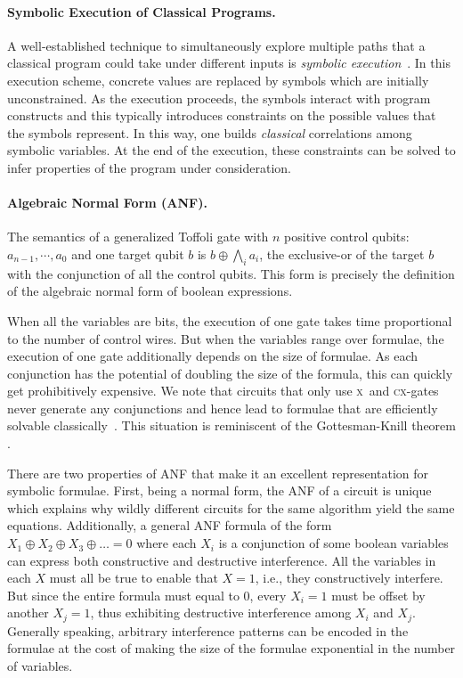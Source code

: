 \documentclass[aps,prl,twocolumn,superscriptaddress,floatfix,notitlepage]{revtex4-2}
\newcommand{\x}{\textsc{x}}
\newcommand{\cx}{\textsc{cx}}
\begin{document}
\paragraph*{Symbolic Execution of Classical Programs.}
A well-established technique to simultaneously explore multiple paths
that a classical program could take under different inputs is
\emph{symbolic
  execution}~\cite{10.1145/390016.808445,10.1145/360248.360252,howden,10.1145/800191.805647,10.1145/3182657}. In
this execution scheme, concrete values are replaced by symbols which are
initially unconstrained. As the execution proceeds, the symbols
interact with program constructs and this typically introduces
constraints on the possible values that the symbols represent. In this way, one 
builds {\it classical} correlations among symbolic variables. At the
end of the execution, these constraints can be solved to infer
properties of the program under consideration. 

\paragraph*{Algebraic Normal Form (ANF).}
The semantics of a generalized Toffoli gate with $n$ positive control qubits:
$a_{n-1},\cdots,a_0$ and one target qubit $b$ is $b \oplus \bigwedge_i
a_i$, the exclusive-or of the target $b$ with the conjunction of all
the control qubits. This form is precisely the definition of the algebraic
normal form of boolean expressions. 

When all the variables are bits, the execution of one 
gate takes time proportional to the number of control wires. But when the 
variables range over formulae, the execution of one gate additionally depends
on the size of formulae. As each conjunction has the potential of doubling the 
size of the formula, this can quickly get prohibitively expensive. We note that circuits that only
use \x\ and \cx-gates never generate any conjunctions and hence lead
to formulae that are efficiently solvable
classically~\cite{10.5555/35517,TOKAREVA20151}. This situation is reminiscent of the Gottesman-Knill theorem \cite{GKThm}.

There are two properties of ANF that make it an excellent representation for symbolic formulae. First, being a normal form, the ANF of a circuit is unique which
explains why wildly different circuits for the same algorithm yield the same
equations. Additionally, a general ANF formula of the form $ X_1 \oplus
X_2 \oplus X_3 \oplus \ldots = 0$ where each $X_i$ is a conjunction of
some boolean variables can express both constructive and destructive interference.
All the variables in each $X$ must all be true to enable that
$X=1$, i.e., they constructively interfere. But since the entire formula must equal to 0, every $X_i = 1$ must
be offset by another $X_j = 1$, thus exhibiting destructive interference
among $X_i$ and $X_j$. Generally speaking, arbitrary interference
patterns can be encoded in the formulae at the cost of making the size
of the formulae exponential in the number of variables.
\end{document}
